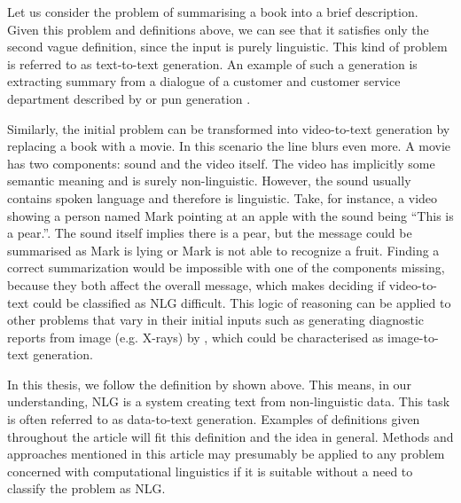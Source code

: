 Let us consider the problem of summarising a book into a brief description. Given this problem and definitions above, we can see that it satisfies only the second vague definition, since the input is purely linguistic. This kind of problem is referred to as text-to-text generation. An example of such a generation is extracting summary from a dialogue of a customer and customer service department described by \cite{liu2019automatic} or pun generation \cite{ritchie2005computational}.
 
Similarly, the initial problem can be transformed into video-to-text generation by replacing a book with a movie. In this scenario the line blurs even more. A movie has two components: sound and the video itself. The video has implicitly some semantic meaning and is surely non-linguistic. However, the sound usually contains spoken language and therefore is linguistic. Take, for instance, a video showing a person named Mark pointing at an apple with the sound being “This is a pear.”. The sound itself implies there is a pear, but the message could be summarised as Mark is lying or Mark is not able to recognize a fruit. Finding a correct summarization would be impossible with one of the components missing, because they both affect the overall message, which makes deciding if video-to-text could be classified as NLG difficult. This logic of reasoning can be applied to other problems that vary in their initial inputs such as generating diagnostic reports from image (e.g. X-rays) by \cite{zeng2020generating}, which could be characterised as image-to-text generation.

In this thesis, we follow the definition by \cite{reiter1997building} shown above. This means, in our understanding, NLG is a system creating text from non-linguistic data. This task is often referred to as data-to-text generation. Examples of definitions given throughout the article will fit this definition and the idea in general. Methods and approaches mentioned in this article may presumably be applied to any problem concerned with computational linguistics if it is suitable without a need to classify the problem as NLG.

